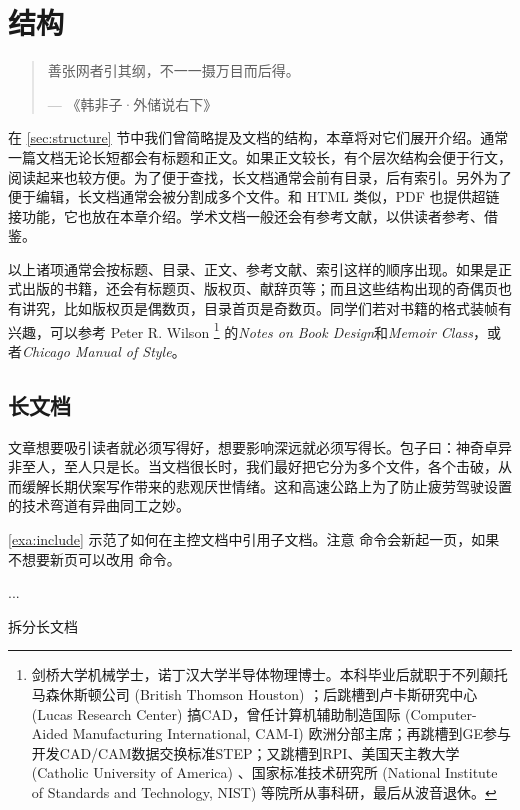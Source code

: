 \chapter{结构}
\label{chp:structure}

\begin{quotation}
善张网者引其纲，不一一摄万目而后得。
\begin{flushright}
--- 《韩非子·外储说右下》
\end{flushright}
\end{quotation}

在 \ref{sec:structure} 节中我们曾简略提及文档的结构，本章将对它们展开介绍。通常一篇文档无论长短都会有标题和正文。如果正文较长，有个层次结构会便于行文，阅读起来也较方便。为了便于查找，长文档通常会前有目录，后有索引。另外为了便于编辑，长文档通常会被分割成多个文件。和 HTML 类似，PDF 也提供超链接功能，它也放在本章介绍。学术文档一般还会有参考文献，以供读者参考、借鉴。

以上诸项通常会按标题、目录、正文、参考文献、索引这样的顺序出现。如果是正式出版的书籍，还会有标题页、版权页、献辞页等；而且这些结构出现的奇偶页也有讲究，比如版权页是偶数页，目录首页是奇数页。同学们若对书籍的格式装帧有兴趣，可以参考 Peter R. Wilson\indexWilson{} \footnote{剑桥大学机械学士，诺丁汉大学半导体物理博士。本科毕业后就职于不列颠托马森休斯顿公司 (British Thomson Houston) ；后跳槽到卢卡斯研究中心 (Lucas Research Center) 搞CAD，曾任计算机辅助制造国际 (Computer-Aided Manufacturing International, CAM-I) 欧洲分部主席；再跳槽到GE参与开发CAD/CAM数据交换标准STEP；又跳槽到RPI、美国天主教大学 (Catholic University of America) 、国家标准技术研究所 (National Institute of Standards and Technology, NIST) 等院所从事科研，最后从波音退休。} 的\emph{Notes on Book Design}\citep{Wilson_2009}和\emph{Memoir Class}\citep{Wilson_2010}，或者\emph{Chicago Manual of Style}\citep{Chicago_2003}。

\section{长文档}

文章想要吸引读者就必须写得好，想要影响深远就必须写得长。包子曰：神奇卓异非至人，至人只是长。当文档很长时，我们最好把它分为多个文件，各个击破，从而缓解长期伏案写作带来的悲观厌世情绪。这和高速公路上为了防止疲劳驾驶设置的技术弯道有异曲同工之妙。

\autoref{exa:include} 示范了如何在主控文档中引用子文档。注意 \verb|| 命令会新起一页，如果不想要新页可以改用 \verb|| 命令。

\begin{example}[h]
\begin{Code}[]



...

\end{Code}
\caption{拆分长文档}
\label{exa:include}
\end{example}

